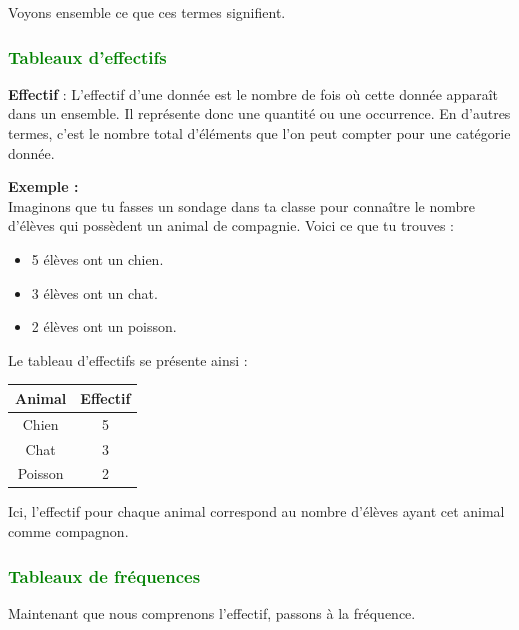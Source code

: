 \documentclass{article}
\begin{document}
Voyons ensemble ce que ces termes signifient.

\subsubsection{\textcolor{green}{Tableaux d'effectifs}}

\begin{tcolorbox}
\textbf{Effectif} : L'effectif d'une donnée est le nombre de fois où cette donnée apparaît dans un ensemble. Il représente donc une quantité ou une occurrence. En d'autres termes, c'est le nombre total d'éléments que l'on peut compter pour une catégorie donnée.
\end{tcolorbox}

\begin{tcolorbox}
\textbf{Exemple :} \\  
Imaginons que tu fasses un sondage dans ta classe pour connaître le nombre d'élèves qui possèdent un animal de compagnie. Voici ce que tu trouves :
\begin{itemize}
    \item 5 élèves ont un chien.
    \item 3 élèves ont un chat.
    \item 2 élèves ont un poisson.
\end{itemize}
Le tableau d'effectifs se présente ainsi :

\begin{center}
\begin{tabular}{|c|c|}
\hline
Animal & Effectif \\
\hline
Chien & 5 \\
Chat & 3 \\
Poisson & 2 \\
\hline
\end{tabular}
\end{center}

Ici, l'effectif pour chaque animal correspond au nombre d'élèves ayant cet animal comme compagnon.
\end{tcolorbox}

\subsubsection{\textcolor{green}{Tableaux de fréquences}}

Maintenant que nous comprenons l'effectif, passons à la fréquence.
\end{document}
